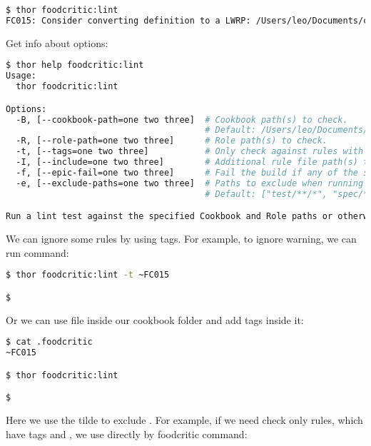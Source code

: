 \begin{lstlisting}[language=Bash,label=lst:testing-thor4]
$ thor foodcritic:lint
FC015: Consider converting definition to a LWRP: /Users/leo/Documents/chef_book/code/my-server-cloud/site-cookbooks/my_cool_app/definitions/enable_web_site.rb:1
\end{lstlisting}

Get info about options:

\begin{lstlisting}[language=Bash,label=lst:testing-thor5]
$ thor help foodcritic:lint
Usage:
  thor foodcritic:lint

Options:
  -B, [--cookbook-path=one two three]  # Cookbook path(s) to check.
                                       # Default: /Users/leo/Documents/chef_book/code/my-server-cloud/site-cookbooks/my_cool_app
  -R, [--role-path=one two three]      # Role path(s) to check.
  -t, [--tags=one two three]           # Only check against rules with the specified tags.
  -I, [--include=one two three]        # Additional rule file path(s) to load.
  -f, [--epic-fail=one two three]      # Fail the build if any of the specified tags are matched.
  -e, [--exclude-paths=one two three]  # Paths to exclude when running tests.
                                       # Default: ["test/**/*", "spec/**/*", "features/**/*"]

Run a lint test against the specified Cookbook and Role paths or otherwise your current working directory.
\end{lstlisting}

We can ignore some rules by using tags. For example, to ignore  warning, we can run command:

\begin{lstlisting}[language=Bash,label=lst:testing-thor6]
$ thor foodcritic:lint -t ~FC015

$
\end{lstlisting}

Or we can use  file inside our cookbook folder and add tags inside it:

\begin{lstlisting}[language=Bash,label=lst:testing-thor7]
$ cat .foodcritic
~FC015

$ thor foodcritic:lint

$
\end{lstlisting}

Here we use the tilde \inline{~} to exclude .
For example, if we need check only rules, which have tags  and , we use directly by foodcritic command:

